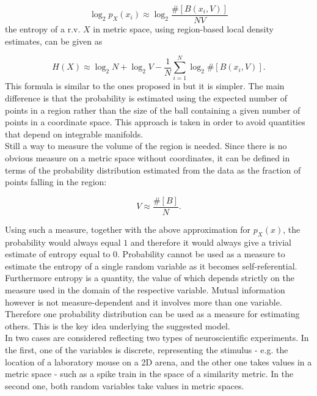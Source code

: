 \documentclass[12pt]{extarticle}
\begin{document}
\begin{equation}
\log_2 p_X(x_i) \approx \log_2 \frac{\#[B(x_i,V)]}{NV}
\end{equation}
the entropy of a r.v. $X$ in metric space, using region-based local density estimates, can be given as

\begin{equation}
H(X) \approx \log_2N + \log_2V - \frac{1}{N} \sum_{i = 1}^{N} \log_2\#[B(x_i,V)].
\end{equation}
This formula is similar to the ones proposed in \cite{KL,KRAS} but it is simpler. The main difference is that the probability is estimated using the expected number of points in a region rather than the size of the ball containing a given number of points in a coordinate space. This approach is taken in order to avoid quantities that depend on integrable manifolds.\\

\noindent
Still a way to measure the volume of the region is needed. Since there is no obvious measure on a metric space without coordinates, it can be defined in terms of the probability distribution estimated from the data as the fraction of points falling in the region:

\begin{equation}
V\approx \frac{\#[B]}{N}.
\end{equation}

\noindent
Using such a measure, together with the above approximation for $p_X(x)$, the probability would always equal $1$ and therefore it would always give a trivial estimate of entropy equal to $0$. Probability cannot be used as a measure to estimate the entropy of a single random variable as it becomes self-referential. Furthermore entropy is a quantity, the value of which depends strictly on the measure used in the domain of the respective variable. Mutual information however is not measure-dependent and it involves more than one variable. Therefore one probability distribution can be used as a measure for estimating others. This is the key idea underlying the suggested model.\\

\noindent
In \cite{HC14} two cases are considered reflecting two types of neuroscientific experiments. In the first, one of the variables is discrete, representing the stimulus - e.g. the location of a laboratory mouse on a 2D arena, and the other one takes values in a metric space - such as a spike train in the space of a similarity metric. In the second one, both random variables  take values in metric spaces.\\ 
\end{document}
